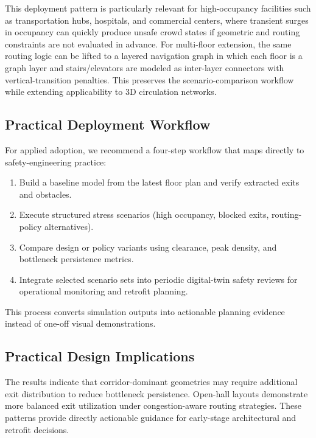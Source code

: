 \documentclass[journal]{IEEEtran}
\begin{document}
This deployment pattern is particularly relevant for high-occupancy facilities such as transportation hubs, hospitals, and commercial centers, where transient surges in occupancy can quickly produce unsafe crowd states if geometric and routing constraints are not evaluated in advance.
For multi-floor extension, the same routing logic can be lifted to a layered navigation graph in which each floor is a graph layer and stairs/elevators are modeled as inter-layer connectors with vertical-transition penalties. This preserves the scenario-comparison workflow while extending applicability to 3D circulation networks.

\subsection{Practical Deployment Workflow}
For applied adoption, we recommend a four-step workflow that maps directly to safety-engineering practice:
\begin{enumerate}
    \item Build a baseline model from the latest floor plan and verify extracted exits and obstacles.
    \item Execute structured stress scenarios (high occupancy, blocked exits, routing-policy alternatives).
    \item Compare design or policy variants using clearance, peak density, and bottleneck persistence metrics.
    \item Integrate selected scenario sets into periodic digital-twin safety reviews for operational monitoring and retrofit planning.
\end{enumerate}
This process converts simulation outputs into actionable planning evidence instead of one-off visual demonstrations.

\subsection{Practical Design Implications}
The results indicate that corridor-dominant geometries may require additional exit distribution to reduce bottleneck persistence. Open-hall layouts demonstrate more balanced exit utilization under congestion-aware routing strategies. These patterns provide directly actionable guidance for early-stage architectural and retrofit decisions.
\end{document}
